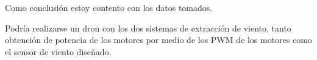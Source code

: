 
Como conclusión estoy contento con los datos tomados.

Podría realizarse un dron con los dos sistemas de extracción de viento, tanto obtención de potencia de los motores por medio de los PWM de los motores como el sensor de viento diseñado.